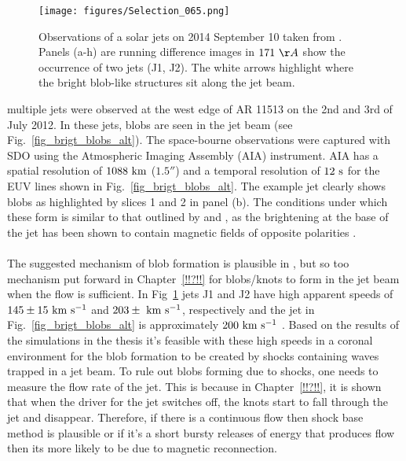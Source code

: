 \documentclass[12pt]{ociamthesis}
\newcommand{\kms}{~\rm{km ~s^{-1}}}
\newcommand{\np}{\\ \\}
\begin{document}
\begin{figure*}[h]
\begin{centering}
\texttt{[image: figures/Selection\_065.png]}
\caption{Observations of a solar jets on  2014 September 10 taken from \cite{Zhang2016SoPh291859Z}. Panels (a-h) are running difference images in $171~\AA$ show the occurrence of two jets (J1, J2). The white arrows highlight where the bright blob-like structures sit along the jet beam.}
\label{fig_brigt_blobs_2} 
\end{centering}
\end{figure*}
%
\cite{Chen2015ApJ81571C, Chen2017ApJ84054C} multiple jets were observed at the west edge of AR 11513 on the 2nd and 3rd of July 2012. In these jets, blobs are seen in the jet beam (see Fig.~\ref{fig_brigt_blobs_alt}). The space-bourne observations were captured with SDO using the Atmospheric Imaging Assembly (AIA) instrument. AIA has a spatial resolution of $1088~\rm{km}$ ($\ang{;;1.5}$) and a temporal resolution of $12~\rm{s}$ for the EUV lines shown in Fig.~\ref{fig_brigt_blobs_alt}. The example jet clearly shows blobs as highlighted by slices 1 and 2 in panel (b). The conditions under which these form is similar to that outlined by \cite{Zhang2014AA567A11Z} and \cite{Zhang2016SoPh291859Z}, as the brightening at the base of the jet has been shown to contain magnetic fields of opposite polarities \citep{Chen2017ApJ84054C}. \np
%
The suggested mechanism of blob formation is plausible in \cite{Zhang2016SoPh291859Z}, but so too mechanism put forward in Chapter~\ref{!!?!!} for blobs/knots to form in the jet beam when the flow is sufficient. In Fig~\ref{fig_brigt_blobs_2} jets J1 and J2 have high apparent speeds of $145\pm15\kms$ and $203\pm\kms$, respectively \citep{Zhang2016SoPh291859Z} and the jet in Fig.~\ref{fig_brigt_blobs_alt} is approximately $200\kms$ \citep{Chen2017ApJ84054C}. Based on the results of the simulations in the thesis it's feasible with these high speeds in a coronal environment for the blob formation to be created by shocks containing waves trapped in a jet beam. To rule out blobs forming due to shocks, one needs to measure the flow rate of the jet. This is because in Chapter~\ref{!!?!!}, it is shown that when the driver for the jet switches off, the knots start to fall through the jet and disappear. Therefore, if there is a continuous flow then shock base method is plausible or if it’s a short bursty releases of energy that produces flow then its more likely to be due to magnetic reconnection.
\end{document}
